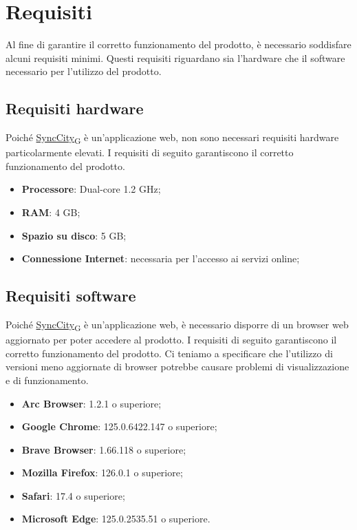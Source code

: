 \section{Requisiti}
Al fine di garantire il corretto funzionamento del prodotto, è necessario soddisfare alcuni requisiti minimi. Questi requisiti riguardano sia l'hardware che il software necessario per l'utilizzo del prodotto.
\subsection{Requisiti hardware}
Poiché \href{https://7last.github.io/docs/pb/documentazione-interna/glossario\#synccity}{SyncCity\textsubscript{G}} è un'applicazione web, non sono necessari requisiti hardware particolarmente elevati. I requisiti di seguito garantiscono il corretto funzionamento del prodotto.
\begin{itemize}
    \item \textbf{Processore}: Dual-core 1.2 GHz;
    \item \textbf{RAM}: 4 GB;
    \item \textbf{Spazio su disco}: 5 GB;
    \item \textbf{Connessione Internet}: necessaria per l'accesso ai servizi online;
\end{itemize}
\subsection{Requisiti software}
Poiché \href{https://7last.github.io/docs/pb/documentazione-interna/glossario\#synccity}{SyncCity\textsubscript{G}} è un'applicazione web, è necessario disporre di un browser web aggiornato per poter accedere al prodotto. I requisiti di seguito garantiscono il corretto funzionamento del prodotto. Ci teniamo a specificare che l'utilizzo di versioni meno aggiornate di browser potrebbe causare problemi di visualizzazione e di funzionamento.
\begin{itemize}
    \item \textbf{Arc Browser}: 1.2.1 o superiore;
    \item \textbf{Google Chrome}: 125.0.6422.147 o superiore;
    \item \textbf{Brave Browser}: 1.66.118 o superiore;
    \item \textbf{Mozilla Firefox}: 126.0.1 o superiore;
    \item \textbf{Safari}: 17.4 o superiore;
    \item \textbf{Microsoft Edge}: 125.0.2535.51 o superiore.
\end{itemize}